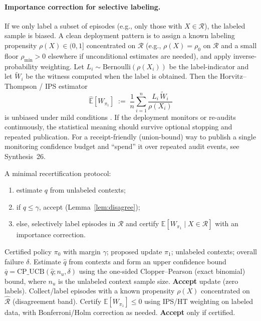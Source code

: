 \documentclass[11pt]{article}
\begin{document}
\paragraph{Importance correction for selective labeling.}
If we only label a subset of episodes (e.g., only those with $X\in\mathcal{R}$), the labeled sample is biased.
A clean deployment pattern is to assign a known labeling propensity $\rho(X)\in(0,1]$ concentrated on $\mathcal{R}$ (e.g., $\rho(X)=\rho_0$ on $\mathcal{R}$ and a small floor $\rho_{\min}>0$ elsewhere if unconditional estimates are needed), and apply inverse-probability weighting.
Let $L_i\sim\mathrm{Bernoulli}(\rho(X_i))$ be the label-indicator and let $\widetilde{W}_i$ be the witness computed when the label is obtained.
Then the Horvitz--Thompson / IPS estimator
\[
\widehat{\mathbb E}[W_{\pi_1}]\;:=\;\frac{1}{n}\sum_{i=1}^n \frac{L_i\,\widetilde{W}_i}{\rho(X_i)}
\]
is unbiased under mild conditions \cite{horvitz1952}.
If the deployment monitors or re-audits continuously, the statistical meaning should survive optional stopping and repeated publication.
For a receipt-friendly (union-bound) way to publish a single monitoring confidence budget and ``spend'' it over repeated audit events, see Synthesis~26.\cite{series:anytimespend}

A minimal recertification protocol:
\begin{enumerate}
  \item estimate $q$ from unlabeled contexts;
  \item if $q\le \gamma$, accept (Lemma~\ref{lem:disagree});
  \item else, selectively label episodes in $\mathcal{R}$ and certify $\mathbb{E}[W_{\pi_1}\mid X\in\mathcal{R}]$ with an importance correction.
\end{enumerate}

\begin{algorithm}[t]
\caption{Disagreement-gated recertification (single SLA)}
\label{alg:gate}
\begin{algorithmic}[1]
\Require Certified policy $\pi_0$ with margin $\gamma$; proposed update $\pi_1$; unlabeled contexts; overall failure $\delta$.
\State Estimate $\widehat{q}$ from contexts and form an upper confidence bound $\overline{q}=\mathrm{CP\_UCB}(\widehat{q};n_u,\delta)$ using the one-sided Clopper--Pearson (exact binomial) bound, where $n_u$ is the unlabeled context sample size.
  \State \Return \textbf{Accept} update (zero labels).
\Else
  \State Collect/label episodes with a known propensity $\rho(X)$ concentrated on $\widehat{\mathcal{R}}$ (disagreement band).
  \State Certify $\mathbb{E}[W_{\pi_1}]\le 0$ using IPS/HT weighting on labeled data, with Bonferroni/Holm correction as needed.
  \State \Return \textbf{Accept} only if certified.
\EndIf
\end{algorithmic}
\end{algorithm}
\end{document}
